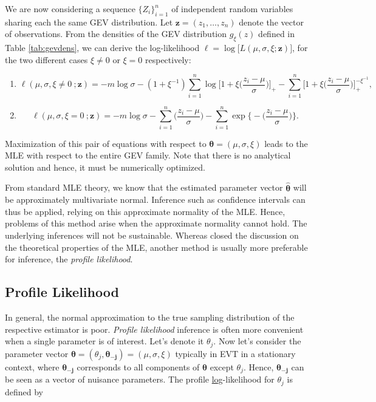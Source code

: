 We are now considering a sequence $\{Z_i\}_{i=1}^n$ of independent random variables sharing 
each the same GEV distribution. Let $\boldsymbol{z}=(z_1,\dots,z_n)$ denote the vector of 
observations.
From the densities of the GEV distribution $g_{\xi}(z)$ defined in 
Table \ref{tab:gevdens}, we can derive the log-likelihood 
$\ell=\log\big[L(\mu,\sigma,\xi;\boldsymbol{z})\big]$, for the two different cases $\xi\neq 0$ or $\xi=0$ respectively:
\begin{enumerate}
	\item \begin{equation} \label{llik12}
	\ell(\mu,\sigma,\xi\neq 0\ ;\textbf{z})= 
	-m\log\sigma-(1+\xi^{-1})\sum_{i=1}^n\log\bigg[1+\xi\bigg(\frac{z_i-\mu}{\sigma}\bigg)\bigg]_+-\sum_{i=1}^n\bigg[1+\xi\bigg(\frac{z_i-\mu}{\sigma}\bigg)\bigg]_+^{-\xi^{-1}},
	\end{equation}
	
	\item \begin{equation} \label{llik0}
	\ell(\mu,\sigma,\xi=0\ ;\textbf{z})=-m\log 
	\sigma-\sum_{i=1}^n\bigg(\frac{z_i-\mu}{\sigma}\bigg)-\sum_{i=1}^{n}\exp\bigg\{-\bigg(\frac{z_i-\mu}{\sigma}\bigg)\bigg\}.
	\end{equation}
\end{enumerate}

Maximization of this pair of equations with respect to $\boldsymbol{\theta}=(\mu,\sigma,\xi)$ leads to the MLE with respect to the entire GEV family. Note that there is no analytical solution and hence, it must be numerically optimized.

From standard MLE theory, we know that the estimated parameter vector $\hat{\boldsymbol{\theta}}$ will be approximately multivariate normal. Inference such as confidence intervals can thus be applied, relying on this approximate normality of the MLE. Hence, problems of this method arise when the approximate normality cannot hold. The underlying inferences will not be sustainable. Whereas \citet{zhou_extent_2010} closed the discussion on the theoretical properties of the MLE, another method is usually more preferable for inference, the \emph{profile likelihood}.


\subsection*{Profile Likelihood}

In general, the normal approximation to the true sampling distribution of the respective estimator is poor. \emph{Profile likelihood} inference is often more convenient when a single parameter is of interest. Let's denote it $\theta_j$. Now let's consider the parameter vector $\boldsymbol{\theta}=(\theta_j,\boldsymbol{\theta_{-j}})= (\mu,\sigma,\xi)$ typically in EVT in a stationary context, where $\boldsymbol{\theta_{-j}}$ corresponds to all components of $\boldsymbol{\theta}$ except $\theta_j$. Hence, $\boldsymbol{\theta_{-j}}$ can be seen as a vector of nuisance parameters.
The profile \underline{log}-likelihood for $\theta_j$ is defined by 

